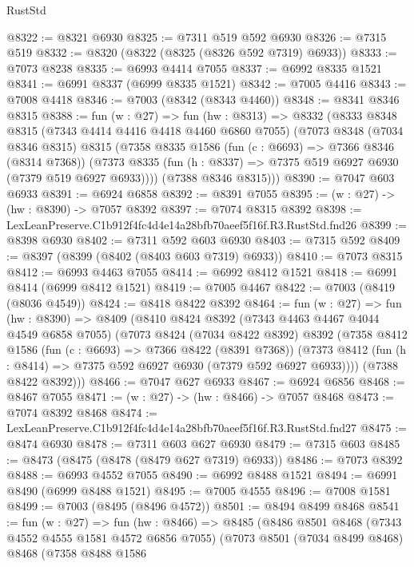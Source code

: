 \begin{lexlean}{RustStd}
\begin{coremodule}
@8322 := @8321 @6930
@8325 := @7311 @519 @592 @6930
@8326 := @7315 @519
@8332 := @8320 (@8322 (@8325 (@8326 @592 @7319) @6933))
@8333 := @7073 @8238
@8335 := @6993 @4414 @7055
@8337 := @6992 @8335 @1521
@8341 := @6991 @8337 (@6999 @8335 @1521)
@8342 := @7005 @4416
@8343 := @7008 @4418
@8346 := @7003 (@8342 (@8343 @4460))
@8348 := @8341 @8346 @8315
@8388 := fun (w : @27) =>
  fun (hw : @8313) =>
  @8332
    (@8333
      @8348
      @8315
      (@7343 @4414 @4416 @4418 @4460 @6860 @7055)
      (@7073
        @8348
        (@7034 @8346 @8315)
        @8315
        (@7358
          @8335
          @1586
          (fun (c : @6693) => @7366 @8346 (@8314 @7368))
          (@7373 @8335 (fun (h : @8337) => @7375 @519 @6927 @6930 (@7379 @519 @6927 @6933))))
        (@7388 @8346 @8315)))
@8390 := @7047 @603 @6933
@8391 := @6924 @6858
@8392 := @8391 @7055
@8395 := (w : @27) -> (hw : @8390) -> @7057 @8392
@8397 := @7074 @8315 @8392
@8398 := LexLeanPreserve.C1b912f4fc4d4e14a28bfb70aeef5f16f.R3.RustStd.fnd26
@8399 := @8398 @6930
@8402 := @7311 @592 @603 @6930
@8403 := @7315 @592
@8409 := @8397 (@8399 (@8402 (@8403 @603 @7319) @6933))
@8410 := @7073 @8315
@8412 := @6993 @4463 @7055
@8414 := @6992 @8412 @1521
@8418 := @6991 @8414 (@6999 @8412 @1521)
@8419 := @7005 @4467
@8422 := @7003 (@8419 (@8036 @4549))
@8424 := @8418 @8422 @8392
@8464 := fun (w : @27) =>
  fun (hw : @8390) =>
  @8409
    (@8410
      @8424
      @8392
      (@7343 @4463 @4467 @4044 @4549 @6858 @7055)
      (@7073
        @8424
        (@7034 @8422 @8392)
        @8392
        (@7358
          @8412
          @1586
          (fun (c : @6693) => @7366 @8422 (@8391 @7368))
          (@7373 @8412 (fun (h : @8414) => @7375 @592 @6927 @6930 (@7379 @592 @6927 @6933))))
        (@7388 @8422 @8392)))
@8466 := @7047 @627 @6933
@8467 := @6924 @6856
@8468 := @8467 @7055
@8471 := (w : @27) -> (hw : @8466) -> @7057 @8468
@8473 := @7074 @8392 @8468
@8474 := LexLeanPreserve.C1b912f4fc4d4e14a28bfb70aeef5f16f.R3.RustStd.fnd27
@8475 := @8474 @6930
@8478 := @7311 @603 @627 @6930
@8479 := @7315 @603
@8485 := @8473 (@8475 (@8478 (@8479 @627 @7319) @6933))
@8486 := @7073 @8392
@8488 := @6993 @4552 @7055
@8490 := @6992 @8488 @1521
@8494 := @6991 @8490 (@6999 @8488 @1521)
@8495 := @7005 @4555
@8496 := @7008 @1581
@8499 := @7003 (@8495 (@8496 @4572))
@8501 := @8494 @8499 @8468
@8541 := fun (w : @27) =>
  fun (hw : @8466) =>
  @8485
    (@8486
      @8501
      @8468
      (@7343 @4552 @4555 @1581 @4572 @6856 @7055)
      (@7073
        @8501
        (@7034 @8499 @8468)
        @8468
        (@7358
          @8488
          @1586

\end{coremodule}
\end{lexlean}
